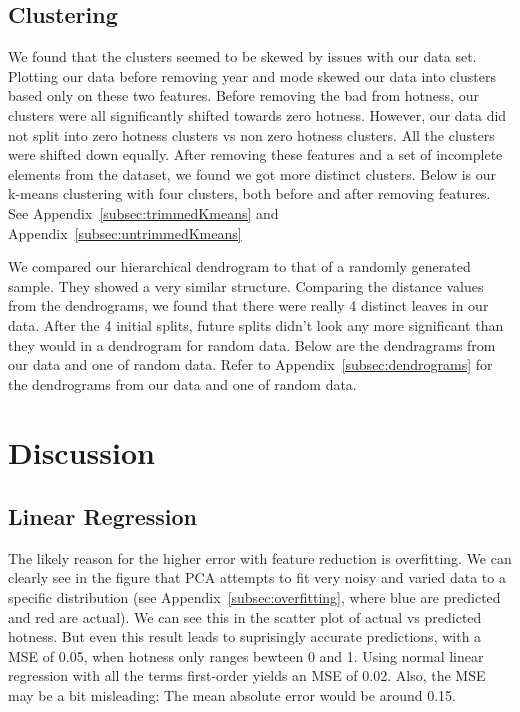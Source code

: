 \documentclass[12pt]{article}
\begin{document}
\subsection{Clustering}
\label{subsec:clusteringResults}
We found that the clusters seemed to be skewed by issues with our data set. Plotting our data before removing year and mode skewed our data into clusters based only on these two features. Before removing the bad from hotness, our clusters were all significantly shifted towards zero hotness. However, our data did not split into zero hotness clusters vs non zero hotness clusters. All the clusters were shifted down equally. After removing these features and a set of incomplete elements from the dataset, we found we got more distinct clusters. Below is our k-means clustering with four clusters, both before and after removing features.
See Appendix~\ref{subsec:trimmedKmeans} and Appendix~\ref{subsec:untrimmedKmeans}


We compared our hierarchical dendrogram to that of a randomly generated sample. They showed a very similar structure. Comparing the distance values from the dendrograms, we found that there were really 4 distinct leaves in our data. After the 4 initial splits, future splits didn't look any more significant than they would in a dendrogram for random data. Below are the dendragrams from our data and one of random data.
Refer to Appendix~\ref{subsec:dendrograms} for the dendrograms from our data and one of random data.
\section{Discussion}
\label{sec:discussion}
\subsection{Linear Regression}
\label{subsec:linearRegressionDisc}
The likely reason for the higher error with feature reduction is overfitting. We can clearly see in the figure that PCA attempts to fit very noisy and varied data to a specific distribution (see Appendix~\ref{subsec:overfitting}, where blue are predicted and red are actual). We can see this in the scatter plot of actual vs predicted hotness. But even this result leads to suprisingly accurate predictions, with a MSE of 0.05, when hotness only ranges bewteen 0 and 1. Using normal linear regression with all the terms first-order yields an MSE of 0.02.  Also, the MSE may be a bit misleading: The mean absolute error would be around 0.15. 
\end{document}
